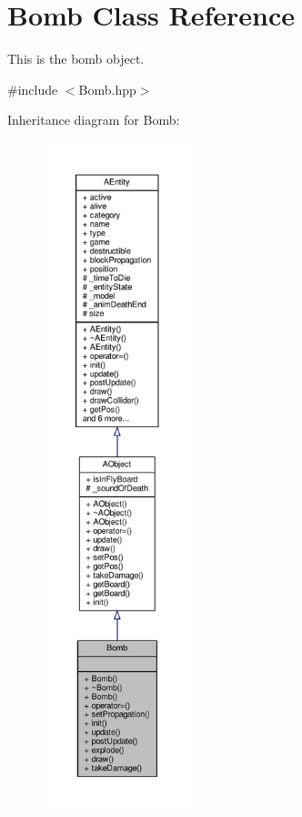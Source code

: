 \hypertarget{class_bomb}{}\section{Bomb Class Reference}
\label{class_bomb}


This is the bomb object.  




{\ttfamily \#include $<$Bomb.\+hpp$>$}



Inheritance diagram for Bomb\+:
\nopagebreak
\begin{figure}[H]
\begin{center}
\leavevmode
\includegraphics[height=550pt]{class_bomb__inherit__graph}
\end{center}
\end{figure}


